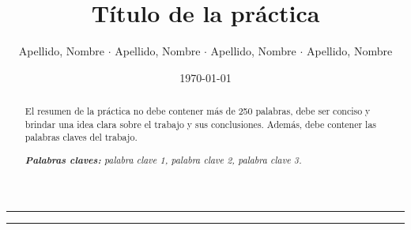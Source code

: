 \documentclass[11pt]{article}
\title{\LARGE\textbf{Título de la práctica}}
\author{\normalsize{Apellido, Nombre $\cdot$ Apellido, Nombre $\cdot$ Apellido, Nombre $\cdot$ Apellido, Nombre}}
\date{\small{\today}}
\begin{document}
\renewcommand{\BOthers}[1]{et al.\hbox{}}


\maketitle


\hrule

\begin{abstract}
\noindent %
El resumen de la práctica no debe contener más de 250 palabras, debe ser conciso y brindar una idea clara sobre el trabajo y sus conclusiones. Además, debe contener las palabras claves del trabajo.

\noindent\textit{\textbf{Palabras claves:} palabra clave 1, palabra clave 2, palabra clave 3.}

\end{abstract}

\hrule
\end{document}
